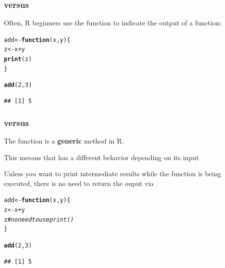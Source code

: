 \documentclass[12pt]{beamer}\usepackage[]{graphicx}\usepackage[]{color}
\makeatletter
\newcommand{\hlnum}[1]{\textcolor[rgb]{0.686,0.059,0.569}{#1}}%
\newcommand{\hlcom}[1]{\textcolor[rgb]{0.678,0.584,0.686}{\textit{#1}}}%
\newcommand{\hlopt}[1]{\textcolor[rgb]{0,0,0}{#1}}%
\newcommand{\hlstd}[1]{\textcolor[rgb]{0.345,0.345,0.345}{#1}}%
\newcommand{\hlkwa}[1]{\textcolor[rgb]{0.161,0.373,0.58}{\textbf{#1}}}%
\newcommand{\hlkwb}[1]{\textcolor[rgb]{0.69,0.353,0.396}{#1}}%
\newcommand{\hlkwc}[1]{\textcolor[rgb]{0.333,0.667,0.333}{#1}}%
\newcommand{\hlkwd}[1]{\textcolor[rgb]{0.737,0.353,0.396}{\textbf{#1}}}%
\newenvironment{kframe}{%
 \def\at@end@of@kframe{}%
 \ifinner\ifhmode%
  \def\at@end@of@kframe{\end{minipage}}%
  \begin{minipage}{\columnwidth}%
 \fi\fi%
 \def\FrameCommand##1{\hskip\@totalleftmargin \hskip-\fboxsep
 \colorbox{shadecolor}{##1}\hskip-\fboxsep
     \hskip-\linewidth \hskip-\@totalleftmargin \hskip\columnwidth}%
 \MakeFramed {\advance\hsize-\width
   \@totalleftmargin\z@ \linewidth\hsize
   \@setminipage}}%
 {\par\unskip\endMakeFramed%
 \at@end@of@kframe}
\newenvironment{knitrout}{}{} %
\makeatother
\begin{document}
\begin{frame}[fragile]
\frametitle{ versus }

Often, R beginners use the function  to indicate the output
of a function:

\begin{knitrout}\footnotesize
{}\color{fgcolor}\begin{kframe}
\begin{alltt}
\hlstd{add} \hlkwb{<-} \hlkwa{function}\hlstd{(}\hlkwc{x}\hlstd{,} \hlkwc{y}\hlstd{) \{}
  \hlstd{z} \hlkwb{<-} \hlstd{x} \hlopt{+} \hlstd{y}
  \hlkwd{print}\hlstd{(z)}
\hlstd{\}}

\hlkwd{add}\hlstd{(}\hlnum{2}\hlstd{,} \hlnum{3}\hlstd{)}
\end{alltt}
\begin{verbatim}
## [1] 5
\end{verbatim}
\end{kframe}
\end{knitrout}

\end{frame}


\begin{frame}[fragile]
\frametitle{ versus }

\bbi
  \item The function  is a \textbf{generic} method in R.
  \item This meeans that  has a different behavior depending on
  its input
  \item Unless you want to print intermediate results while the function is
  being executed, there is no need to return the ouput via 
\ei
\begin{knitrout}\footnotesize
{}\color{fgcolor}\begin{kframe}
\begin{alltt}
\hlstd{add} \hlkwb{<-} \hlkwa{function}\hlstd{(}\hlkwc{x}\hlstd{,} \hlkwc{y}\hlstd{) \{}
  \hlstd{z} \hlkwb{<-} \hlstd{x} \hlopt{+} \hlstd{y}
  \hlstd{z}  \hlcom{# no need to use print()}
\hlstd{\}}

\hlkwd{add}\hlstd{(}\hlnum{2}\hlstd{,} \hlnum{3}\hlstd{)}
\end{alltt}
\begin{verbatim}
## [1] 5
\end{verbatim}
\end{kframe}
\end{knitrout}

\end{frame}
\end{document}
